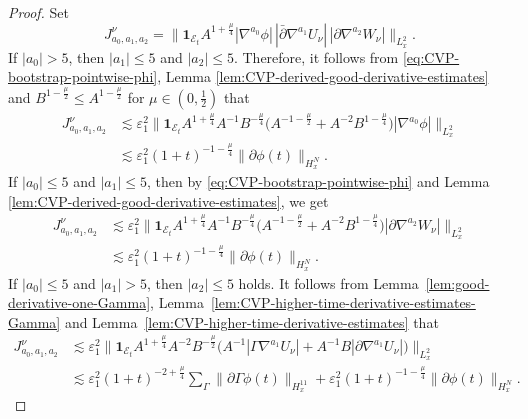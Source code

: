 \documentclass[11pt,twoside]{article}
\def\f{\frac}
\def\p{\partial}
\def\ve{\varepsilon}
\def\ls{\lesssim}
\theoremstyle{plain}
\theoremstyle{definition}
\theoremstyle{assumption}
\numberwithin{equation}{section}
\begin{document}
\begin{proof}
		Set
		\[
		J_{a_0,a_1,a_2}^{\nu}
		=
		\big\|
		\mathbf 1_{\mathcal E_t}
		A^{1+\frac{\mu}{4}}
		|\nabla^{a_0}\phi|\,
		|\bar\p\nabla^{a_1}U_\nu|\,
		|\p\nabla^{a_2}W_\nu|
		\big\|_{L^2_x}.
		\]
		If \(|a_0|>5\), then \(|a_1|\le 5\) and \(|a_2|\le 5\). Therefore, it follows from \eqref{eq:CVP-bootstrap-pointwise-phi}, Lemma \ref{lem:CVP-derived-good-derivative-estimates} and $B^{1-\f\mu2}\le A^{1-\f\mu2}$ for $\mu\in(0,\f12)$ that
		\begin{equation}
			\label{eq:CVP-R31-high-phi-new}
			\begin{aligned}
				J_{a_0,a_1,a_2}^{\nu}
				&\ls
				\ve_1^2
				\big\|
				\mathbf 1_{\mathcal E_t}
				A^{1+\frac{\mu}{4}}
				A^{-1}B^{-\frac{\mu}{4}}
				\big(
				A^{-1-\frac{\mu}{2}}
				+
				A^{-2}B^{1-\frac{\mu}{4}}
				\big)
				|\nabla^{a_0}\phi|
				\big\|_{L^2_x}\\
				&\ls
				\ve_1^2
				(1+t)^{-1-\frac{\mu}{4}}
				\|\p\phi(t)\|_{H^N_x}.
			\end{aligned}
		\end{equation}
		If \(|a_0|\le 5\) and \(|a_1|\le 5\), then by \eqref{eq:CVP-bootstrap-pointwise-phi} and Lemma \ref{lem:CVP-derived-good-derivative-estimates}, we get
		\begin{equation}
			\label{eq:CVP-R31-low-good-new}
			\begin{aligned}
				J_{a_0,a_1,a_2}^{\nu}
				&\ls
				\ve_1^2
				\big\|
				\mathbf 1_{\mathcal E_t}
				A^{1+\frac{\mu}{4}}
				A^{-1}B^{-\frac{\mu}{4}}
				\big(
				A^{-1-\frac{\mu}{2}}
				+
				A^{-2}B^{1-\frac{\mu}{4}}
				\big)
				|\p\nabla^{a_2}W_\nu|
				\big\|_{L^2_x}
				\\
				&\ls
				\ve_1^2
				(1+t)^{-1-\frac{\mu}{4}}
				\|\p\phi(t)\|_{H^N_x}.
			\end{aligned}
		\end{equation}
		If \(|a_0|\le 5\) and \(|a_1|>5\), then
		\(|a_2|\le 5\) holds.
It follows from Lemma~\ref{lem:good-derivative-one-Gamma}, Lemma~\ref{lem:CVP-higher-time-derivative-estimates-Gamma}
and Lemma~\ref{lem:CVP-higher-time-derivative-estimates} that
		\begin{equation}
			\label{eq:CVP-R31-high-good-new}
			\begin{aligned}
				J_{a_0,a_1,a_2}^{\nu}
				&\ls
				\ve_1^2
				\big\|
				\mathbf 1_{\mathcal E_t}
				A^{1+\frac{\mu}{4}}
				A^{-2}B^{-\frac{\mu}{2}}
				\big(
				A^{-1}|\Gamma\nabla^{a_1}U_\nu|
				+
				A^{-1}B|\p\nabla^{a_1}U_\nu|
				\big)
				\big\|_{L^2_x}
				\\
				&\ls
				\ve_1^2
				(1+t)^{-2+\frac{\mu}{4}}
				\sum_{\Gamma}
				\|\p\Gamma\phi(t)\|_{H^{11}_x}
				+
				\ve_1^2
				(1+t)^{-1-\frac{\mu}{4}}
				\|\p\phi(t)\|_{H^N_x}.
			\end{aligned}
		\end{equation}
		

\end{proof}
\end{document}
